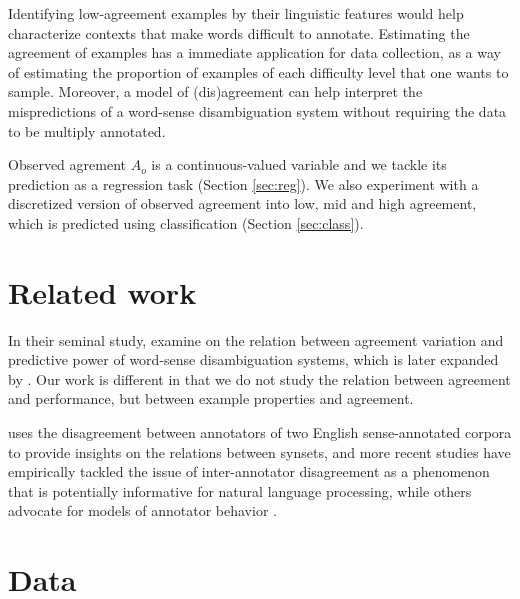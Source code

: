 \documentclass[11pt,a4paper]{article}
\begin{document}



Identifying low-agreement examples by their linguistic features would help characterize contexts that make words difficult to annotate. Estimating the agreement of examples has a immediate application for data collection, as a way of estimating the proportion of examples of each difficulty level that one wants to sample. Moreover, a model of (dis)agreement can help interpret the mispredictions of a word-sense disambiguation system without requiring the data to be multiply annotated. 

Observed agrement $A_o$ is a continuous-valued variable and we tackle its prediction as a regression task (Section \ref{sec:reg}). We also experiment with a discretized version of observed agreement into low, mid and high agreement, which is predicted using classification (Section \ref{sec:class}).  

\section{Related work}
In their seminal study,  examine on the relation between agreement variation and predictive power of word-sense disambiguation systems, which is later expanded by . Our work is different in that we do not study the relation between agreement and performance, but between example properties and agreement.

 uses the disagreement between annotators of two English sense-annotated corpora to provide insights on the relations between synsets, and more recent studies \cite{Jurgens2013,Plank2014,Jurgens2014,lopezdelacalleagirre2015} have empirically tackled the issue of inter-annotator disagreement as a phenomenon that is potentially informative for natural language processing, while others advocate for models of annotator behavior \cite{Passenau2010,Passonneau2014,Cohn2013}. 

\section{Data}
\end{document}

